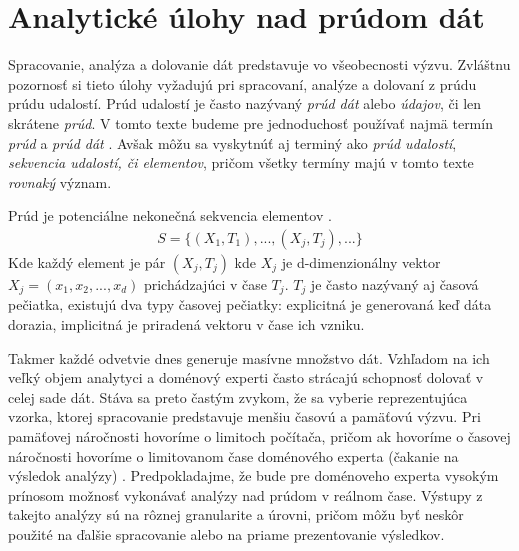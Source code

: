 \chapter{Analytické úlohy nad prúdom dát}
\label{Analytické úlohy v prúde dát}
Spracovanie, analýza a dolovanie dát predstavuje vo všeobecnosti výzvu. Zvláštnu pozornosť si tieto úlohy vyžadujú pri spracovaní, analýze a dolovaní z prúdu prúdu udalostí. Prúd udalostí je často nazývaný \textit{prúd dát} alebo \textit{údajov}, či len skrátene \textit{prúd}. V tomto texte budeme pre jednoduchosť používať najmä termín \textit{prúd} a \textit{prúd dát} \citep{tran2014change}. Avšak môžu sa vyskytnúť aj terminý ako \textit{prúd udalostí}, \textit{sekvencia udalostí, či elementov}, pričom všetky termíny majú v tomto texte \textit{rovnaký} význam. \par
\begin{definition}{Prúd je potenciálne nekonečná sekvencia elementov \citep{tran2014change}.}
\begin{align*}
	S = \{(X_1,T_1), ..., (X_j,T_j), ...\}
\end{align*}
Kde každý element je pár $(X_j,T_j)$ kde $X_j$ je d-dimenzionálny vektor $X_j = (x_1, x_2, ..., x_d)$ prichádzajúci v čase $T_j$. $T_j$ je často nazývaný aj časová pečiatka, existujú dva typy časovej pečiatky: explicitná je generovaná keď dáta dorazia, implicitná je priradená vektoru v čase ich vzniku.
\end{definition}

Takmer každé odvetvie dnes generuje masívne množstvo dát. Vzhľadom na ich veľký objem analytyci a doménový experti často strácajú schopnosť dolovať v celej sade dát. Stáva sa preto častým zvykom, že sa vyberie reprezentujúca vzorka, ktorej spracovanie predstavuje menšiu časovú a pamäťovú výzvu. Pri pamäťovej náročnosti hovoríme o limitoch počítača, pričom ak hovoríme o časovej náročnosti hovoríme o limitovanom čase doménového experta (čakanie na výsledok analýzy) \citep{hulten2001mining}. Predpokladajme, že bude pre doménoveho experta vysokým prínosom možnosť vykonávať analýzy nad prúdom v reálnom čase. Výstupy z takejto analýzy sú na rôznej granularite a úrovni, pričom môžu byť neskôr použité na ďalšie spracovanie alebo na priame prezentovanie výsledkov. \par

